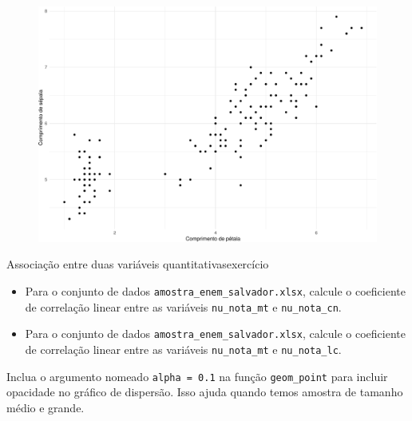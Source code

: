 \documentclass[
  10pt,
  ignorenonframetext,
]{beamer}
\providecommand{\tightlist}{%
  \setlength{\itemsep}{0pt}\setlength{\parskip}{0pt}}\usepackage{longtable,booktabs,array}
\begin{document}
\begin{frame}
\begin{figure}

{\centering \includegraphics[width=1\textwidth,height=\textheight]{exploracao-visualizacao_files/figure-beamer/unnamed-chunk-128-1.pdf}

}

\end{figure}
\end{frame}

\begin{frame}[fragile]{Associação entre duas variáveis
quantitativas\newline exercício}
\protect\hypertarget{associauxe7uxe3o-entre-duas-variuxe1veis-quantitativasexercuxedcio}{}
\begin{itemize}
\tightlist
\item
  Para o conjunto de dados \texttt{amostra\_enem\_salvador.xlsx},
  calcule o coeficiente de correlação linear entre as variáveis
  \texttt{nu\_nota\_mt} e \texttt{nu\_nota\_cn}.
\item
  Para o conjunto de dados \texttt{amostra\_enem\_salvador.xlsx},
  calcule o coeficiente de correlação linear entre as variáveis
  \texttt{nu\_nota\_mt} e \texttt{nu\_nota\_lc}.
\end{itemize}

Inclua o argumento nomeado \texttt{alpha\ =\ 0.1} na função
\texttt{geom\_point} para incluir opacidade no gráfico de dispersão.
Isso ajuda quando temos amostra de tamanho médio e grande.
\end{frame}
\end{document}
